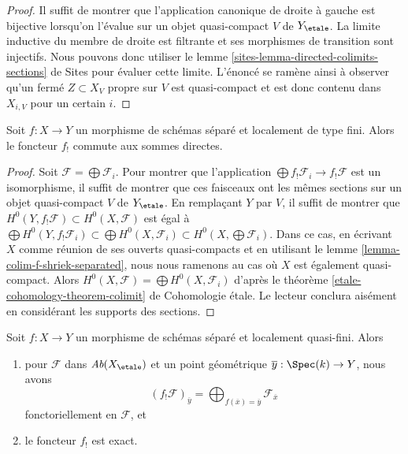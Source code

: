 \begin{proof}
Il suffit de montrer que l'application canonique de
droite à gauche est bijective lorsqu'on l'évalue sur un objet
quasi-compact $V$ de $Y_\etale$.
La limite inductive du membre de droite est filtrante
et ses morphismes de transition sont injectifs.
Nous pouvons donc utiliser le
lemme \ref{sites-lemma-directed-colimits-sections} de Sites
pour évaluer cette limite. L'énoncé se ramène ainsi à observer
qu'un fermé $Z \subset X_V$ propre sur $V$ est quasi-compact
et est donc contenu dans $X_{i, V}$ pour un certain $i$.
\end{proof}

\begin{lemma}
\label{lemma-f-shriek-separated-direct-sums}
Soit $f : X \to Y$ un morphisme de schémas séparé et
localement de type fini. Alors le foncteur $f_!$ commute aux sommes directes.
\end{lemma}

\begin{proof}
Soit $\mathcal{F} = \bigoplus \mathcal{F}_i$. Pour montrer que l'application
$\bigoplus f_!\mathcal{F}_i \to f_!\mathcal{F}$ est un isomorphisme,
il suffit de montrer que ces faisceaux ont les mêmes sections sur
un objet quasi-compact $V$ de $Y_\etale$. En remplaçant $Y$ par $V$,
il suffit de montrer que
$H^0(Y, f_!\mathcal{F}) \subset H^0(X, \mathcal{F})$
est égal à
$\bigoplus H^0(Y, f_!\mathcal{F}_i)
\subset \bigoplus H^0(X, \mathcal{F}_i)
\subset H^0(X, \bigoplus \mathcal{F}_i)$.
Dans ce cas, en écrivant $X$ comme réunion de ses ouverts quasi-compacts
et en utilisant le lemme \ref{lemma-colim-f-shriek-separated},
nous nous ramenons au cas où $X$ est également quasi-compact.
Alors $H^0(X, \mathcal{F}) = \bigoplus H^0(X, \mathcal{F}_i)$
d'après le théorème \ref{etale-cohomology-theorem-colimit} de Cohomologie étale.
Le lecteur conclura aisément en considérant les supports des sections.
\end{proof}

\begin{lemma}
\label{lemma-lqf-f-shriek-separated-colimits}
Soit $f : X \to Y$ un morphisme de schémas séparé et
localement quasi-fini. Alors
\begin{enumerate}
\item pour $\mathcal{F}$ dans $\textit{Ab}(X_\etale)$ et un point
géométrique $\overline{y} : \Spec(k) \to Y$, nous avons
$$
(f_!\mathcal{F})_{\overline{y}} =
\bigoplus\nolimits_{f(\overline{x}) = \overline{y}} \mathcal{F}_{\overline{x}}
$$
fonctoriellement en $\mathcal{F}$, et
\item le foncteur $f_!$ est exact.
\end{enumerate}
\end{lemma}

